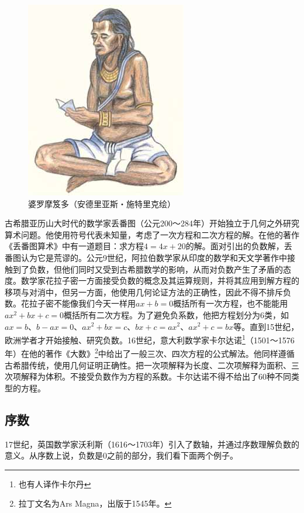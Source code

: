 \documentclass[b5paper]{ctexart}
\begin{document}
\begin{figure}[htbp]
 \centering
 \includegraphics[scale=0.3]{img/Brahmagupta}
 \caption{婆罗摩笈多（安德里亚斯・施特里克绘）}
 \label{fig:Brahmagupta}
\end{figure}

古希腊亚历山大时代的数学家丢番图（公元200～284年）开始独立于几何之外研究算术问题。他使用符号代表未知量，考虑了一次方程和二次方程的解。在他的著作《丢番图算术》中有一道题目：求方程$4 = 4x + 20$的解。面对引出的负数解，丢番图认为它是荒谬的。公元9世纪，阿拉伯数学家从印度的数学和天文学著作中接触到了负数，但他们同时又受到古希腊数学的影响，从而对负数产生了矛盾的态度。数学家花拉子密一方面接受负数的概念及其运算规则，并将其应用到解方程的移项与对消中，但另一方面，他使用几何论证方法的正确性，因此不得不排斥负数。花拉子密不能像我们今天一样用$ax + b = 0$概括所有一次方程，也不能能用$ax^2 + bx + c = 0$概括所有二次方程。为了避免负系数，他把方程划分为6类，如$ax = b$、$b - ax = 0$、$ax^2 + bx = c$、$bx + c = ax^2$、$ax^2 + c = bx$等。直到15世纪，欧洲学者才开始接触、研究负数。16世纪，意大利数学家卡尔达诺\footnote{也有人译作卡尔丹}（1501～1576年）在他的著作《大数》\footnote{拉丁文名为Ars Magna，出版于1545年。}中给出了一般三次、四次方程的公式解法。他同样遵循古希腊传统，使用几何证明正确性。把一次项解释为长度、二次项解释为面积、三次项解释为体积。不接受负数作为方程的系数。卡尔达诺不得不给出了60种不同类型的方程。

\subsection{序数}
  
17世纪，英国数学家沃利斯（1616～1703年）引入了数轴，并通过序数理解负数的意义。从序数上说，负数是0之前的部分，我们看下面两个例子。
\end{document}
